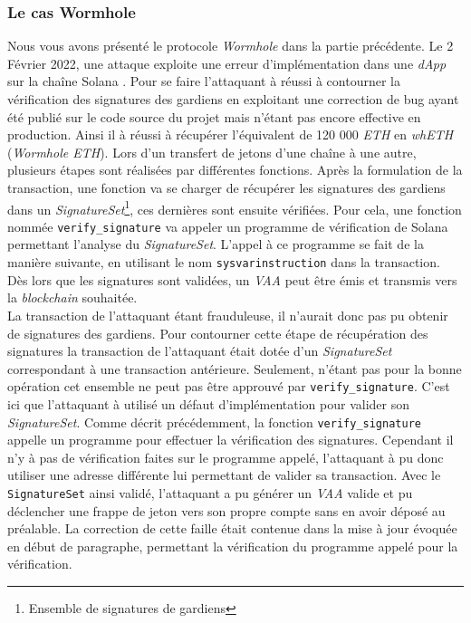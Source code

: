 \subsubsection{Le cas Wormhole}
Nous vous avons présenté le protocole \textit{Wormhole} dans la partie précédente. 
Le 2 Février 2022, une attaque exploite une erreur d'implémentation dans une \textit{\gls{dApp}} sur la chaîne Solana \cite{SolMed} \cite{SolRekt}. 
Pour se faire l'attaquant à réussi à contourner la vérification des signatures des gardiens en exploitant
une correction de bug ayant été publié sur le code source du projet mais n'étant pas encore effective en production.
Ainsi il à réussi à récupérer l'équivalent de 120 000 \textit{ETH} en \textit{whETH} (\textit{Wormhole ETH}). 
Lors d'un transfert de jetons d'une chaîne à une autre, plusieurs étapes sont réalisées par différentes fonctions.
Après la formulation de la transaction, une fonction va se charger de récupérer les signatures des gardiens dans un \textit{SignatureSet}\footnote{Ensemble de signatures de gardiens}, ces dernières sont ensuite vérifiées. 
Pour cela, une fonction nommée \texttt{verify\_signature} va appeler un programme de vérification de Solana permettant l'analyse du \textit{SignatureSet}. 
L'appel à ce programme se fait de la manière suivante, en utilisant le nom \texttt{sysvarinstruction} \cite{SolGitError} dans la transaction. 
Dès lors que les signatures sont validées, un \textit{VAA} peut être émis et transmis vers la \textit{\gls{blockchain}} souhaitée. \\
La transaction de l'attaquant étant frauduleuse, il n'aurait donc pas pu obtenir de signatures des gardiens. 
Pour contourner cette étape de récupération des signatures la transaction de l'attaquant était dotée d'un \textit{SignatureSet} correspondant à une transaction antérieure. 
Seulement, n'étant pas pour la bonne opération cet ensemble ne peut pas être approuvé par \texttt{verify\_signature}. 
C'est ici que l'attaquant à utilisé un défaut d'implémentation pour valider son \textit{SignatureSet}. 
Comme décrit précédemment, la fonction \texttt{verify\_signature} appelle un programme pour effectuer la vérification des signatures. 
Cependant il n'y à pas de vérification faites sur le programme appelé, l'attaquant à pu donc utiliser une adresse différente lui permettant de valider sa transaction. 
Avec le  \texttt{SignatureSet} ainsi validé, l'attaquant a pu générer un \textit{VAA} valide et pu déclencher une frappe de jeton vers son propre compte sans en avoir déposé au préalable. 
La correction de cette faille était contenue dans la mise à jour évoquée en début de paragraphe\cite{SolGitFixed}, permettant la vérification du programme appelé pour la vérification. 

